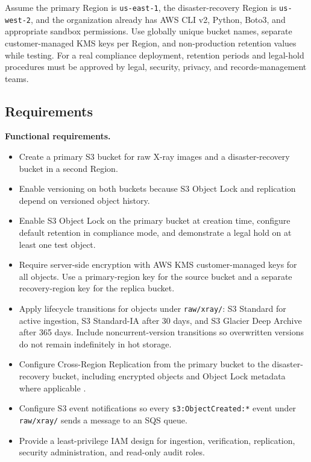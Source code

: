 Assume the primary Region is \texttt{us-east-1}, the disaster-recovery Region is \texttt{us-west-2}, and the organization already has AWS CLI v2, Python, Boto3, and appropriate sandbox permissions. Use globally unique bucket names, separate customer-managed KMS keys per Region, and non-production retention values while testing. For a real compliance deployment, retention periods and legal-hold procedures must be approved by legal, security, privacy, and records-management teams.

\subsection*{Requirements}
\textbf{Functional requirements.}
\begin{itemize}
    \item Create a primary S3 bucket for raw X-ray images and a disaster-recovery bucket in a second Region.
    \item Enable versioning on both buckets because S3 Object Lock and replication depend on versioned object history.
    \item Enable S3 Object Lock on the primary bucket at creation time, configure default retention in compliance mode, and demonstrate a legal hold on at least one test object.
    \item Require server-side encryption with AWS KMS customer-managed keys for all objects. Use a primary-region key for the source bucket and a separate recovery-region key for the replica bucket.
    \item Apply lifecycle transitions for objects under \texttt{raw/xray/}: S3 Standard for active ingestion, S3 Standard-IA after 30 days, and S3 Glacier Deep Archive after 365 days. Include noncurrent-version transitions so overwritten versions do not remain indefinitely in hot storage.
    \item Configure Cross-Region Replication from the primary bucket to the disaster-recovery bucket, including encrypted objects and Object Lock metadata where applicable \cite{awsS3Replication,awsS3ObjectLock}.
    \item Configure S3 event notifications so every \texttt{s3:ObjectCreated:*} event under \texttt{raw/xray/} sends a message to an SQS queue.
    \item Provide a least-privilege IAM design for ingestion, verification, replication, security administration, and read-only audit roles.
\end{itemize}


